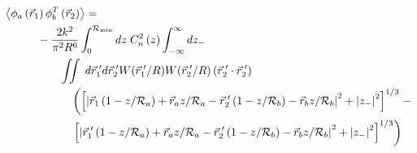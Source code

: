 \begin{equation}\label{eqn:tprphase_n4}
\begin{aligned}
&\left\langle \phi_{a}\left(\vec{r}_{1}\right) \phi^{T}_{b}\left(\vec{r}_{2}\right)\right\rangle = \\
&\quad\quad\quad
-\frac{2k^{2}}{\pi^{2}R^{6}} \int_{0}^{\mathcal{R}_{\rm min}} dz\;C_{n}^{2}\left(z\right) 
\int_{-\infty}^{\infty} dz_{-} \\
&\quad\quad\quad\quad\quad 
\iint  \; d\vec{r}^{\;\prime}_{1}d\vec{r}^{\;\prime}_{2} W(\vec{r}^{\;\prime}_{1}/R) W(\vec{r}^{\;\prime}_{2}/R)
\left(\vec{r}^{\;\prime}_{2} \cdot \vec{r}^{\;\prime}_{2}\right)
\\
&\quad\quad\quad\quad\quad\quad
\left(
\left[\left\vert \vec{r}_{1}\left(1-z/\mathcal{R}_{a}\right) + \vec{r}_{a} z/\mathcal{R}_{a} - \vec{r}^{\;\prime}_{2}\left(1-z/\mathcal{R}_{b}\right) - \vec{r}_{b} z/\mathcal{R}_{b}\right\vert^{2}   + 
\left\vert z_{-} \right\vert^{2}\right]^{1/3}
\right. -
\\
&\quad\quad\quad\quad\quad\quad
\left.
\left[ \left\vert \vec{r}^{\;\prime}_{1}\left(1-z/\mathcal{R}_{a}\right) + \vec{r}_{a} z/\mathcal{R}_{a} - 
 \vec{r}^{\;\prime}_{2}\left(1-z/\mathcal{R}_{b}\right) - \vec{r}_{b} z/\mathcal{R}_{b}\right\vert^{2} + 
\left\vert z_{-} \right\vert^{2}\right]^{1/3}
\right)
\end{aligned}
\end{equation}

